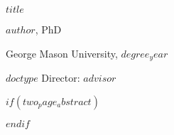 \documentclass[11 pt]{report}
\begin{document}
\tableofcontents

\listoftables

\listoffigures

%                                        


    \pagebreak
    \baselineskip=0.25pc
    \lineskip=0.25pc
    \lineskiplimit=0.25pc

    \thispagestyle{empty}


    \baselineskip=1pc
    \lineskip=1pc
    \lineskiplimit=1pc

    \vskip 0.25cm
    \noi
    \rm\uppercase\expandafter{$title$}
    \nl

     \baselineskip=1pc
     \lineskip=1pc
     \lineskiplimit=1pc

    \noi
    $author$, PhD
    \nl

    \noi
    George Mason University, $degree_year$
    \nl

    \noi
    $doctype$ Director: $advisor$
    \nl

    \vskip 46pt




$if(two_page_abstract)$
\abstractmultiplepage


$endif$


%
\end{document}
